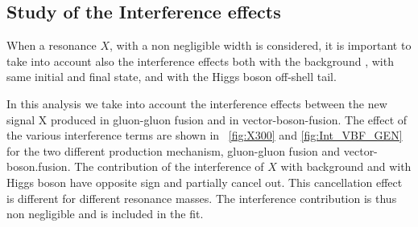\subsection*{Study of the Interference effects}
\label{sec:interference}
When a resonance $X$, with a non negligible width is considered, it is important to take into account also the interference effects both with the \WW background , with same initial and final state, and with the Higgs boson off-shell tail. 

In this analysis  we take into account the interference effects between the
new signal X produced in gluon-gluon fusion and in vector-boson-fusion.
The effect of the various interference terms are shown in ~\ref{fig:X300} and  \ref{fig:Int_VBF_GEN} for the two different production mechanism, gluon-gluon fusion and vector-boson.fusion.  The contribution of the interference of $X$ with \WW background  and with Higgs boson have opposite sign and partially cancel out. This cancellation effect is different for different resonance masses.
The interference contribution is thus non negligible and is included in the fit. \\


